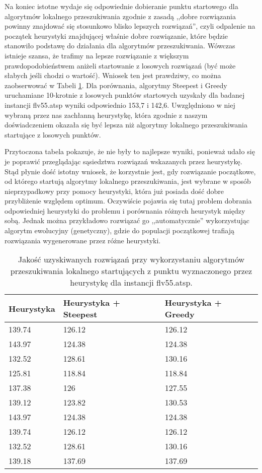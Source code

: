 Na koniec istotne wydaje się odpowiednie dobieranie punktu startowego dla algorytmów lokalnego przeszukiwania zgodnie z zasadą ,,dobre rozwiązania powinny znajdować się stosunkowo blisko lepszych rozwiązań'', czyli odpalenie na początek heurystyki znajdującej właśnie dobre rozwiązanie, które będzie stanowiło podstawę do działania dla algorytmów przeszukiwania. Wówczas istnieje szansa, że trafimy na lepsze rozwiązanie z większym prawdopodobieństwem aniżeli startowanie z losowych rozwiązań (być może słabych jeśli chodzi o wartość). Wniosek ten jest prawdziwy, co można zaobserwować w Tabeli \ref{tab:heur_local}. Dla porównania, algorytmy Steepest i Greedy uruchamiane 10-krotnie z losowych punktów startowych uzyskały dla badanej instancji flv55.atsp wyniki odpowiednio 153,7 i 142,6. Uwzględniono w niej wybraną przez nas zachłanną heurystykę, która zgodnie z naszym doświadczeniem okazała się być lepsza niż algorytmy lokalnego przeszukiwania startujące z losowych punktów.

Przytoczona tabela pokazuje, że nie były to najlepsze wyniki, ponieważ udało się je poprawić przeglądając sąsiedztwa rozwiązań wskazanych przez heurystykę. Stąd płynie dość istotny wniosek, że korzystnie jest, gdy rozwiązanie początkowe, od którego startują algorytmy lokalnego przeszukiwania, jest wybrane w sposób nieprzypadkowy przy pomocy heurystyki, która już posiada dość dobre przybliżenie względem optimum. Oczywiście pojawia się tutaj problem dobrania odpowiedniej heurystyki do problemu i porównania różnych heurystyk między sobą. Jednak można przykładowo rozwiązać go ,,automatycznie'' wykorzystując algorytm ewolucyjny (genetyczny), gdzie do populacji początkowej trafiają rozwiązania wygenerowane przez różne heurystyki.

\begin{table}[h!]
	\centering
       \begin{tabular}{|l|l|l|}
        \hline
		Heurystyka & Heurystyka + Steepest & Heurystyka + Greedy \\
		\hline
		139.74 & 126.12 & 126.12 \\
		143.97 & 124.38 & 124.38 \\
		132.52 & 128.61 & 130.16 \\
		125.81 & 118.84 & 118.84 \\
		137.38 & 126 & 127.55 \\
		139.12 & 123.82 & 130.53 \\
		143.97 & 124.38 & 124.38 \\
		139.74 & 126.12 & 126.12 \\
		132.52 & 128.61 & 130.16 \\
		139.18 & 137.69 & 137.69 \\
		\hline
		\end{tabular}
		\caption{Jakość uzyskiwanych rozwiązań przy wykorzystaniu algorytmów przeszukiwania lokalnego startujących z punktu wyznaczonego przez heurystykę dla instancji flv55.atsp.}
		\label{tab:heur_local}
\end{table}